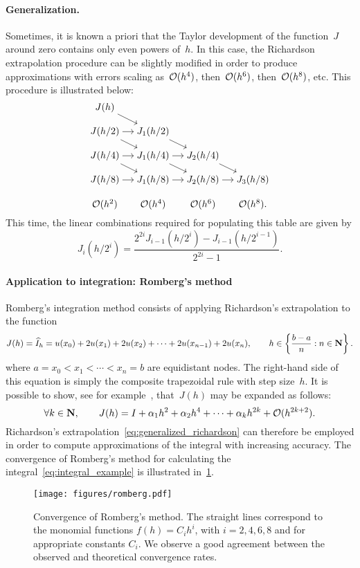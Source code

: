 \paragraph{Generalization.}
Sometimes,
it is known a priori that the Taylor development of the function~$J$ around zero contains only even powers of~$h$.
In this case, the Richardson extrapolation procedure can be slightly modified in order to produce approximations with errors scaling as~$\mathcal O(h^4)$,
then~$\mathcal O(h^6)$, then~$\mathcal O(h^8)$, etc.
This procedure is illustrated below:
\[
    \begin{tikzcd}[cramped, sep=small]
        J(h) \arrow[dr]  \\
        J(h/2) \arrow[r] \arrow[dr] & J_1(h/2) \arrow[dr]  \\
        J(h/4) \arrow[r] \arrow[dr] & J_1(h/4) \arrow[r] \arrow[dr] & J_2(h/4) \arrow[dr]  \\
        J(h/8) \arrow[r] & J_1(h/8) \arrow[r] & J_2(h/8) \arrow[r] & J_3(h/8) \\
        \bigo(h^2) & \bigo(h^4) & \bigo(h^6) & \bigo(h^8).
    \end{tikzcd}
\]
This time, the linear combinations required for populating this table are given by
\begin{equation}
    \label{eq:generalized_richardson}
    J_i(h/2^i) = \frac{2^{2i} J_{i-1} (h/2^i) - J_{i-1}(h/2^{i-1})}{2^{2i} - 1}.
\end{equation}

\paragraph{Application to integration: Romberg's method}
Romberg's integration method consists of applying Richardson's extrapolation to the function
\[
    J(h) = \widehat I_h = u(x_0) + 2 u(x_1) + 2 u(x_2) + \dotsb + 2 u(x_{n-1}) + 2 u(x_n), \qquad h \in \left\{ \frac{b-a}{n}: n \in \mathbf N\right\}.
\]
where $a = x_0 < x_1 < \dotsb < x_n = b$ are equidistant nodes.
The right-hand side of this equation is simply the composite trapezoidal rule with step size~$h$.
It is possible to show, see for example~\cite[Property 9.3]{MR2265914},
that~$J(h)$ may be expanded as follows:
\[
    \forall k \in \mathbf N, \qquad
    J(h) = I + \alpha_1 h^2 + \alpha_2 h^4 + \cdots + \alpha_k h^{2k} + \mathcal O(h^{2k+2}).
\]
Richardson's extrapolation~\eqref{eq:generalized_richardson} can therefore be employed in order to compute approximations of the integral with increasing accuracy.
The convergence of Romberg's method for calculating the integral~\eqref{eq:integral_example} is illustrated in~\cref{fig:romberg}.
\begin{figure}[ht]
    \centering
    \texttt{[image: figures/romberg.pdf]}
    \caption{Convergence of Romberg's method. The straight lines correspond to the monomial functions $f(h) = C_i h^i$,
    with $i = 2, 4, 6, 8$ and for appropriate constants $C_i$.
    We observe a good agreement between the observed and theoretical convergence rates.}%
    \label{fig:romberg}
\end{figure}

